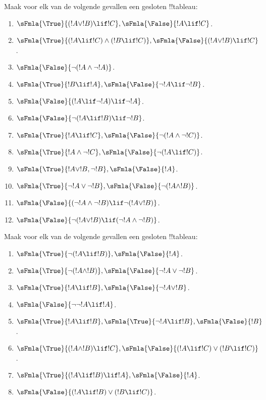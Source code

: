 \documentclass[openany]{memoir}
\begin{document}
\begin{prob}
Maak voor elk van de volgende gevallen een gesloten !!{tableau}:
\begin{enumerate}
\item $\sFmla{\True}{(!A \lor !B) \lif !C}, \sFmla{\False}{!A \lif !C}$.
\item $\sFmla{\True}{(!A \lif !C) \land (!B \lif !C)}, \sFmla{\False}{(!A \lor !B) \lif !C}$.
\item $\sFmla{\False}{\lnot(!A \land \lnot !A)}$.
\item $\sFmla{\True}{!B \lif !A}, \sFmla{\False}{\lnot !A \lif \lnot !B}$.
\item $\sFmla{\False}{(!A \lif \lnot !A) \lif \lnot !A}$.
\item $\sFmla{\False}{\lnot(!A \lif !B) \lif \lnot !B}$.
\item $\sFmla{\True}{!A \lif !C}, \sFmla{\False}{\lnot (!A \land \lnot !C)}$.
\item $\sFmla{\True}{!A \land \lnot !C}, \sFmla{\False}{\lnot (!A \lif !C)}$.
\item $\sFmla{\True}{!A \lor !B, \lnot !B}, \sFmla{\False}{!A}$.
\item $\sFmla{\True}{\lnot !A \lor \lnot !B}, \sFmla{\False}{\lnot(!A \land !B)}$.
\item $\sFmla{\False}{(\lnot !A \land \lnot !B) \lif\lnot(!A \lor !B)}$.
\item $\sFmla{\False}{\lnot(!A \lor !B) \lif (\lnot !A \land \lnot !B)}$.
\end{enumerate}
\end{prob}

\begin{prob}
Maak voor elk van de volgende gevallen een gesloten !!{tableau}:
\begin{enumerate}
\item $\sFmla{\True}{\lnot(!A \lif !B)}, \sFmla{\False}{!A}$.
\item $\sFmla{\True}{\lnot(!A \land !B)}, \sFmla{\False}{\lnot !A \lor \lnot !B}$.
\item $\sFmla{\True}{!A \lif !B}, \sFmla{\False}{\lnot !A \lor !B}$.
\item $\sFmla{\False}{\lnot \lnot !A \lif !A}$.
\item $\sFmla{\True}{!A \lif !B}, \sFmla{\True}{\lnot !A \lif !B}, \sFmla{\False}{!B}$.
\item $\sFmla{\True}{(!A \land !B) \lif !C}, \sFmla{\False}{(!A \lif !C) \lor (!B \lif !C)}$.
\item $\sFmla{\True}{(!A \lif !B) \lif !A}, \sFmla{\False}{!A}$.
\item $\sFmla{\False}{(!A \lif !B) \lor (!B \lif !C)}$.
\end{enumerate}
\end{prob}
\endgroup
\end{document}
